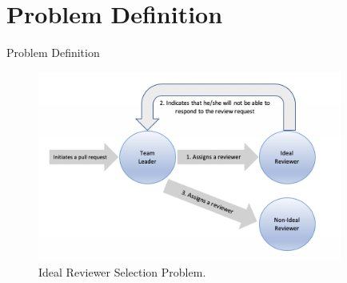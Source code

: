 \documentclass{beamer}
\begin{document}
%
%
\section{Problem Definition}
\begin{frame}{Problem Definition}
    \begin{figure}
    \includegraphics[width=10cm]{ideal-review.png}
    \caption{\label{fig:your-figure}Ideal Reviewer Selection Problem.}
    \end{figure}
\end{frame}
\end{document}
